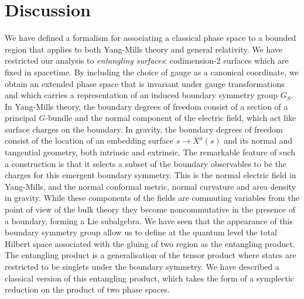 \documentclass[a4paper,11pt]{article}
\begin{document}
\section{Discussion} \label{section:discussion}

We have defined a formalism for associating a classical phase space to a bounded region that applies to both Yang-Mills theory and general relativity.
We have restricted our analysis to {\it entangling surfaces}: codimension-2  surfaces which are fixed in spacetime.
By including the choice of gauge as a canonical coordinate, we obtain an extended phase space that is invariant under gauge transformations and which carries a representation of an induced boundary symmetry group $G_S$.
In Yang-Mills theory, the boundary degrees of freedom consist of a section of a principal $G$-bundle and the normal component of the electric field, which act like surface charges on the boundary.
In gravity, the boundary degrees of freedom consist of the location of an embedding surface $s \to X^a(s)$ and its normal and tangential geometry, both intrinsic and extrinsic.
The remarkable feature of such a construction is that it selects a subset of the boundary observables to be the charges for this emergent boundary symmetry. 
This is the normal electric field in Yang-Mills, and the normal conformal metric, normal curvature and area density in gravity.
While these components of the fields are commuting variables from the point of view of the bulk theory they become noncommutative in the presence of a boundary, forming a Lie subalgebra.
We have seen that the appearance of this boundary symmetry group allow us to define at the quantum level the total Hilbert space associated with the gluing of two region as the entangling product. 
The entangling product is a generalisation of the tensor product where states are restricted to be singlets under the boundary symmetry.
We have described a classical version of this entangling product, which takes the form of a symplectic reduction on the product of two phase spaces.
\end{document}

